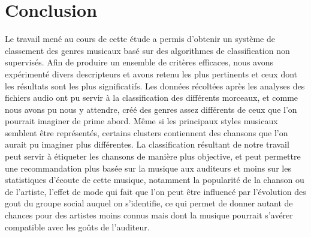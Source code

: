 \documentclass[soumission]{ir}
\begin{document}
\section{Conclusion}
Le travail mené au cours de cette étude a permis d’obtenir un système de classement des genres musicaux basé sur 
des algorithmes de classification non supervisés. Afin de produire un ensemble de critères efficaces, nous avons 
expérimenté divers descripteurs et avons retenu les plus pertinents et ceux dont les résultats sont les plus 
significatifs.  Les données récoltées après les analyses des fichiers audio ont pu servir à la classification des 
différents morceaux, et comme nous avons pu nous y attendre, créé des genres assez différents de ceux que l’on 
pourrait imaginer de prime abord. Même si les principaux styles musicaux semblent être représentés, certains 
clusters contiennent des chansons que l’on aurait pu imaginer plus différentes. La classification résultant de 
notre travail peut servir à étiqueter les chansons de manière plus objective, et peut permettre une 
recommandation plus basée sur la musique aux auditeurs et moins sur les statistiques d’écoute de cette musique, 
notamment la popularité de la chanson ou de l’artiste, l’effet de mode qui fait que l’on peut être influencé par 
l’évolution des gout du groupe social auquel on s’identifie, ce qui permet de donner autant de chances pour des 
artistes moins connus mais dont la musique pourrait s’avérer compatible avec les goûts de l’auditeur.

\pagebreak




\appendix
\end{document}
